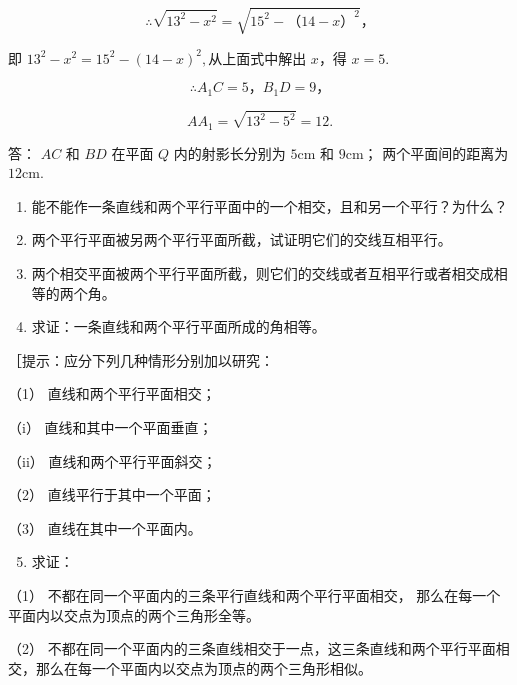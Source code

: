\[
\therefore \sqrt {13^{2} - x ^ {2}} = \sqrt {15^{2} - \text{（}14 - x\text{）} ^ {2}}\text{，}
\]

即 \(13^{2} - x^{2} = 15^{2} - (14 - x)^{2},\)从上面式中解出 \(x\)，得
\(x = 5\).

\[
\therefore A _ {1} C = 5\text{，} B _ {1} D = 9\text{，}
\]

\[
A A _ {1} = \sqrt {13^{2} - 5^{2}} = 12.
\]

答： \(AC\) 和 \(BD\) 在平面 \(Q\) 内的射影长分别为 \(5\mathrm{cm}\) 和
\(9\mathrm{cm}\)； 两个平面间的距离为 \(12\mathrm{cm}\).

\begin{enumerate}
\item
  能不能作一条直线和两个平行平面中的一个相交，且和另一个平行？为什么？
\item
  两个平行平面被另两个平行平面所截，试证明它们的交线互相平行。
\item
  两个相交平面被两个平行平面所截，则它们的交线或者互相平行或者相交成相等的两个角。
\item
  求证：一条直线和两个平行平面所成的角相等。
\end{enumerate}

［提示：应分下列几种情形分别加以研究：

（1） 直线和两个平行平面相交；

（i） 直线和其中一个平面垂直；

（ii） 直线和两个平行平面斜交；

（2） 直线平行于其中一个平面；

（3） 直线在其中一个平面内。

\begin{enumerate}
\setcounter{enumi}{4}
\item
  求证：
\end{enumerate}

（1） 不都在同一个平面内的三条平行直线和两个平行平面相交，
那么在每一个平面内以交点为顶点的两个三角形全等。

（2）
不都在同一个平面内的三条直线相交于一点，这三条直线和两个平行平面相交，那么在每一个平面内以交点为顶点的两个三角形相似。

